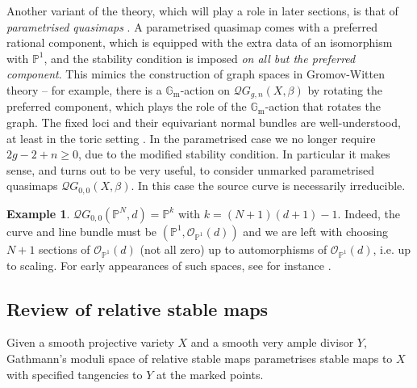 \documentclass[11pt]{amsart}
\newcommand{\QG}[4]{\mathcal{Q}G_{#1,#2}(#3,#4)}
\newcommand{\PP}{\mathbb P}
\newcommand{\Gm}{\mathbb{G}_{\text{m}}}
\theoremstyle{definition}
\theoremstyle{definition}
\newtheorem{example}[thm]{Example}
\begin{document}
Another variant of the theory, which will play a role in later sections, is that of \emph{parametrised quasimaps} \cite[\S 7]{CF-K}. A parametrised quasimap comes with a preferred rational component, which is equipped with the extra data of an isomorphism with $\PP^1$, and the stability condition is imposed \emph{on all but the preferred component}. This mimics the construction of graph spaces in Gromov-Witten theory -- for example, there is a $\Gm$-action on $\QG{g}{n}{X}{\beta}$ by rotating the preferred component, which plays the role of the $\Gm$-action that rotates the graph. The fixed loci and their equivariant normal bundles are well-understood, at least in the toric setting \cite[\S 7]{CF-K}.  In the parametrised case we no longer require $2g-2+n\geq 0$, due to the modified stability condition. In particular it makes sense, and turns out to be very useful, to consider unmarked parametrised quasimaps $\QG{0}{0}{X}{\beta}$. In this case the source curve is necessarily irreducible. 

\begin{example} $\QG{0}{0}{\PP^N}{d} = \PP^k$ with $k=(N+1)(d+1)-1$. Indeed, the curve and line bundle must be $(\PP^1,\mathcal O_{\PP^1}(d))$ and we are left with choosing $N+1$ sections of $\mathcal O_{\PP^1}(d)$ (not all zero) up to automorphisms of $\mathcal O_{\PP^1}(d)$, i.e. up to scaling. For early appearances of such spaces, see for instance \cite{Givental-mirror} \cite{MorrisonPlesser} \cite{Bertram}.\end{example}

\subsection{Review of relative stable maps} \label{Subsection relative stable maps} Given a smooth projective variety $X$ and a smooth very ample divisor $Y$, Gathmann's moduli space of relative stable maps parametrises stable maps to $X$ with specified tangencies to $Y$ at the marked points.
\end{document}
